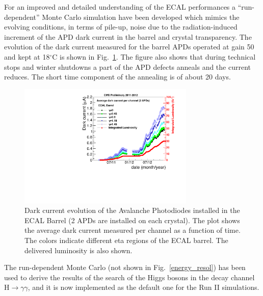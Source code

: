 \documentclass[journal]{IEEEtran}
\begin{document}
For an improved and detailed understanding of the ECAL performances a ``run-dependent'' Monte Carlo simulation have been developed which mimics the evolving conditions, in terms of pile-up, noise due to the radiation-induced increment of the APD dark current in the barrel and crystal transparency. The evolution of the dark current measured for the barrel APDs operated at gain 50 and kept at 18$^\circ$C is shown in Fig.~\ref{fig:idark}. The figure also shows that during technical stops and winter shutdowns a part of the APD defects anneals and the current reduces. The short time component of the annealing is of about 20 days. 
%
\begin{figure}[!t]
  \begin{center}
    \includegraphics[width=3.3in]{HV_avg_history}
    \caption{Dark current evolution of the Avalanche Photodiodes installed in the ECAL Barrel (2 APDs are installed on each crystal). The plot shows the average dark current measured per channel as a function of time. The colors indicate different eta regions of the ECAL barrel. The delivered luminosity is also shown. \label{fig:idark}}
  \end{center}
\end{figure}
%
The run-dependent Monte Carlo (not shown in Fig.~\ref{energy_resol}) has been used to derive the results of the search of the Higgs bosons in the decay channel H$\to\gamma\gamma$, and it is now implemented as the default one for the Run II simulations. 
\end{document}
